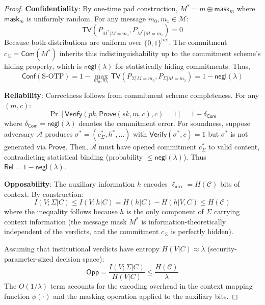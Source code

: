 \documentclass{ieeeaccess}
\newtheorem{proof}{Proof}[section]
\begin{document}
\begin{proof}
\textbf{Confidentiality}: By one-time pad construction, $M^* = m \oplus \mathsf{mask}_m$ where $\mathsf{mask}_m$ is uniformly random. For any message $m_0, m_1 \in \mathcal{M}$:
\begin{equation}
\mathsf{TV}(P_{M^*|M=m_0}, P_{M^*|M=m_1}) = 0
\end{equation}
Because both distributions are uniform over $\{0,1\}^{|m|}$. The commitment $c_\Sigma = \mathsf{Com}(M^*)$ inherits this indistinguishability up to the commitment scheme's hiding property, which is $\mathsf{negl}(\lambda)$ for statistically hiding commitments. Thus,
\begin{equation}
\mathsf{Conf}(\text{S-OTP}) = 1 - \max_{m_0,m_1} \mathsf{TV}(P_{\Sigma|M=m_0}, P_{\Sigma|M=m_1}) = 1 - \mathsf{negl}(\lambda)
\end{equation}

\textbf{Reliability}: Correctness follows from commitment scheme completeness. For any $(m,c)$:
\begin{equation}
\Pr[\mathsf{Verify}(pk, \mathsf{Prove}(sk,m,c), c) = 1] = 1 - \delta_{\mathsf{Com}}
\end{equation}
where $\delta_{\mathsf{Com}} = \mathsf{negl}(\lambda)$ denotes the commitment error. For soundness, suppose adversary $\mathcal{A}$ produces $\sigma^* = (c_\Sigma^*, h^*, \ldots)$ with $\mathsf{Verify}(\sigma^*, c) = 1$ but $\sigma^*$ is not generated via $\mathsf{Prove}$. Then, $\mathcal{A}$ must have opened commitment $c_\Sigma^*$ to valid content, contradicting statistical binding (probability $\leq \mathsf{negl}(\lambda)$). Thus $\mathsf{Rel} = 1 - \mathsf{negl}(\lambda)$.

\textbf{Opposability}: The auxiliary information $h$ encodes $\ell_{\text{aux}} = H(\mathcal{C})$ bits of context. By construction:
\begin{equation}
I(V;\Sigma|C) \leq I(V;h|C) = H(h|C) - H(h|V,C) \leq H(\mathcal{C})
\end{equation}
where the inequality follows because $h$ is the only component of $\Sigma$ carrying context information (the message mask $M^*$ is information-theoretically independent of the verdicts, and the commitment $c_\Sigma$ is perfectly hidden).

Assuming that institutional verdicts have entropy $H(V|C) \approx \lambda$ (security-parameter-sized decision space):
\begin{equation}
\mathsf{Opp} = \frac{I(V;\Sigma|C)}{H(V|C)} \leq \frac{H(\mathcal{C})}{\lambda}
\end{equation}
The $O(1/\lambda)$ term accounts for the encoding overhead in the context mapping function $\phi(\cdot)$ and the masking operation applied to the auxiliary bits.
\end{proof}
\end{document}
